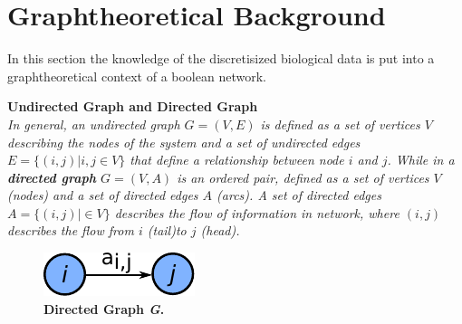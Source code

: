 \newpage
\section{Graphtheoretical Background}
In this section the knowledge of the discretisized biological data is put into a graphtheoretical context of a boolean network.
\begin{defn}
\textbf{Undirected Graph and Directed Graph}\\
\textit{In general, an undirected graph $G=(V,E)$ is defined as a set of vertices $V$ describing the nodes of the system and a set of undirected edges $E = \{ (i,j)|i,j\in V\} $ that define a relationship between node $i$ and $j$. While in a \textbf{directed graph} $G=(V,A)$ is an ordered pair, defined as a set of vertices $V$ (nodes) and a set of directed edges $A$ (arcs). A set of directed edges $A=\{ (i,j)|\in V\} $ describes the flow of information in network, where $(i,j)$ describes the flow from $i$ (tail)to $j$ (head).}\\
\end{defn} 


\begin{figure}[H]
\vspace{-20px}
\centering
\includegraphics{./Bilder/DirectedGraph.pdf}
\caption[Directed Graph]{\textbf{Directed Graph \textit{G}. } }
\label{fig:7}
\end{figure}





